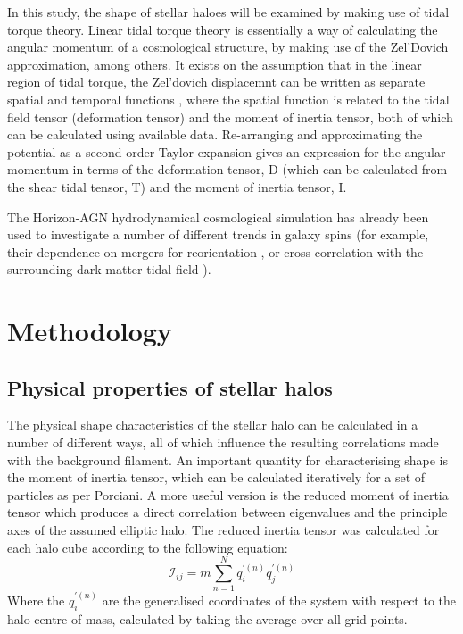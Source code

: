 \documentclass[journal]{IEEEtran}
\begin{document}
In this study, the shape of stellar haloes will be examined by making use of tidal torque theory. Linear tidal torque theory is essentially a way of calculating the angular momentum of a cosmological structure, by making use of the Zel'Dovich approximation, among others. It exists on the assumption that in the linear region of tidal torque, the Zel'dovich displacemnt can be written as separate spatial and temporal functions \cite{porciani02a}, where the spatial function is related to the tidal field tensor (deformation tensor) and the moment of inertia tensor, both of which can be calculated using available data. Re-arranging and approximating the potential as a second order Taylor expansion gives an expression for the angular momentum in terms of the deformation tensor, D (which can be calculated from the shear tidal tensor, T) and the moment of inertia tensor, I. 

The Horizon-AGN hydrodynamical cosmological simulation has already been used to investigate a number of different trends in galaxy spins (for example, their dependence on mergers for reorientation \cite{welker14}, or cross-correlation with the surrounding dark matter tidal field \cite{codis15}).

\section{Methodology}
\subsection{Physical properties of stellar halos}
The physical shape characteristics of the stellar halo can be calculated in a number of different ways, all of which influence the resulting correlations made with the background filament. An important quantity for characterising shape is the moment of inertia tensor, which can be calculated iteratively for a set of particles as per Porciani\cite{porciani02a}. A more useful version is the reduced moment of inertia tensor\cite{tenneti15} which produces a direct correlation between eigenvalues and the principle axes of the assumed elliptic halo. The reduced inertia tensor was calculated for each halo cube according to the following equation:
\begin{equation}
\mathscr{I}_{ij}=m \sum_{n=1}^{N} q_{i}^{'(n)} q_{j}^{'(n)}
\label{eq:moitensor}
\end{equation}
Where the $q_{i}^{'(n)}$ are the generalised coordinates of the system with respect to the halo centre of mass, calculated by taking the average over all grid points.
\end{document}
